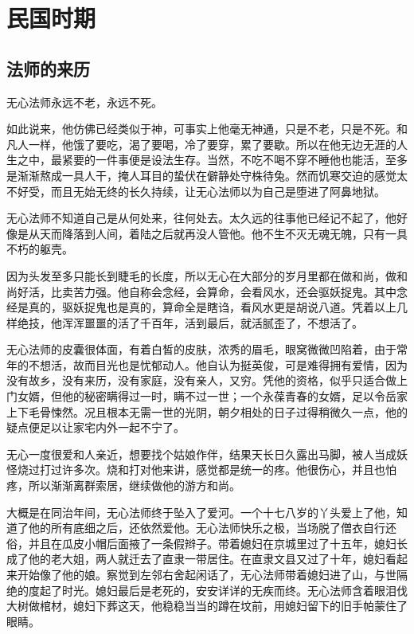 \part{民国时期}

\chapter{法师的来历}

无心法师永远不老，永远不死。

如此说来，他仿佛已经类似于神，可事实上他毫无神通，只是不老，只是不死。和凡人一样，他饿了要吃，渴了要喝，冷了要穿，累了要歇。所以在他无边无涯的人生之中，最紧要的一件事便是设法生存。当然，不吃不喝不穿不睡他也能活，至多是渐渐熬成一具人干，掩人耳目的蛰伏在僻静处守株待兔。然而饥寒交迫的感觉太不好受，而且无始无终的长久持续，让无心法师以为自己是堕进了阿鼻地狱。

无心法师不知道自己是从何处来，往何处去。太久远的往事他已经记不起了，他好像是从天而降落到人间，着陆之后就再没人管他。他不生不灭无魂无魄，只有一具不朽的躯壳。

因为头发至多只能长到睫毛的长度，所以无心在大部分的岁月里都在做和尚，做和尚好活，比卖苦力强。他自称会念经，会算命，会看风水，还会驱妖捉鬼。其中念经是真的，驱妖捉鬼也是真的，算命全是瞎诌，看风水更是胡说八道。凭着以上几样绝技，他浑浑噩噩的活了千百年，活到最后，就活腻歪了，不想活了。

无心法师的皮囊很体面，有着白皙的皮肤，浓秀的眉毛，眼窝微微凹陷着，由于常年的不想活，故而目光也是忧郁动人。他自认为挺英俊，可是难得拥有爱情，因为没有故乡，没有来历，没有家庭，没有亲人，又穷。凭他的资格，似乎只适合做上门女婿，但他的秘密瞒得过一时，瞒不过一世；一个永葆青春的女婿，足以令岳家上下毛骨悚然。况且根本无需一世的光阴，朝夕相处的日子过得稍微久一点，他的疑点便足以让家宅内外一起不宁了。

无心一度很爱和人亲近，想要找个姑娘作伴，结果天长日久露出马脚，被人当成妖怪烧过打过许多次。烧和打对他来讲，感觉都是统一的疼。他很伤心，并且也怕疼，所以渐渐离群索居，继续做他的游方和尚。

大概是在同治年间，无心法师终于坠入了爱河。一个十七八岁的丫头爱上了他，知道了他的所有底细之后，还依然爱他。无心法师快乐之极，当场脱了僧衣自行还俗，并且在瓜皮小帽后面掖了一条假辫子。带着媳妇在京城里过了十五年，媳妇长成了他的老大姐，两人就迁去了直隶一带居住。在直隶文县又过了十年，媳妇看起来开始像了他的娘。察觉到左邻右舍起闲话了，无心法师带着媳妇进了山，与世隔绝的度起了时光。媳妇最后是老死的，安安详详的无疾而终。无心法师含着眼泪伐大树做棺材，媳妇下葬这天，他稳稳当当的蹲在坟前，用媳妇留下的旧手帕蒙住了眼睛。

